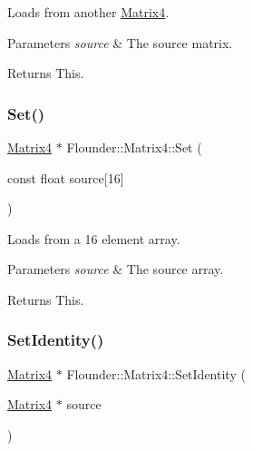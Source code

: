 Loads from another \hyperlink{class_flounder_1_1_matrix4}{Matrix4}. 


\begin{DoxyParams}{Parameters}
{\em source} & The source matrix. \\
\hline
\end{DoxyParams}
\begin{DoxyReturn}{Returns}
This. 
\end{DoxyReturn}
\mbox{\label{class_flounder_1_1_matrix4_ab7d73c241a8ac4dd7f1a88b379190393}} 
\subsubsection{\texorpdfstring{Set()}{Set()}\hspace{0.1cm}{\footnotesize\ttfamily [2/2]}}
{\footnotesize\ttfamily \hyperlink{class_flounder_1_1_matrix4}{Matrix4} $\ast$ Flounder\+::\+Matrix4\+::\+Set (\begin{DoxyParamCaption}\item[{const float}]{source\mbox{[}16\mbox{]} }\end{DoxyParamCaption})}



Loads from a 16 element array. 


\begin{DoxyParams}{Parameters}
{\em source} & The source array. \\
\hline
\end{DoxyParams}
\begin{DoxyReturn}{Returns}
This. 
\end{DoxyReturn}
\mbox{\label{class_flounder_1_1_matrix4_aead2d9bd0456a16cf90f3c84962ff65b}} 
\subsubsection{\texorpdfstring{Set\+Identity()}{SetIdentity()}\hspace{0.1cm}{\footnotesize\ttfamily [1/2]}}
{\footnotesize\ttfamily \hyperlink{class_flounder_1_1_matrix4}{Matrix4} $\ast$ Flounder\+::\+Matrix4\+::\+Set\+Identity (\begin{DoxyParamCaption}\item[{\hyperlink{class_flounder_1_1_matrix4}{Matrix4} $\ast$}]{source }\end{DoxyParamCaption})\hspace{0.3cm}{\ttfamily [static]}}



